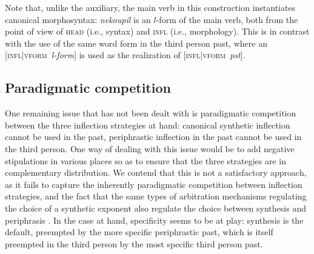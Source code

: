\documentclass[output=paper]{langsci/langscibook}
\begin{document}
Note that, unlike the auxiliary, the main verb in this construction instantiates canonical morphosyntax: \emph{nekoupil} is an $l$-form of the main verb, both from the point of view of \textsc{head} (i.e., syntax) and \textsc{infl} (i.e., morphology). This is in contrast with the use of the same word form in the third person past, where an [\textsc{infl|vform}~\textit{l-form}] is used as the realization of [\textsc{infl|vform}~\textit{pst}]. 

\subsection{Paradigmatic competition}

One remaining issue that has not been dealt with is paradigmatic competition between the three inflection strategies at hand: canonical synthetic inflection cannot be used in the past, periphrastic inflection in the past cannot be used in the third  person. One way of dealing with this issue would be to add negative stipulations in various places so as to ensure that the three strategies are in complementary distribution. We contend that this is not a satisfactory approach, as it fails to capture the inherently paradigmatic competition between inflection strategies, and the fact that the same types of arbitration mechanisms regulating the choice of a synthetic exponent also regulate the choice between synthesis and periphrasis \citep{Bonami14d}. In the case at hand, specificity seems to be at play: synthesis is the default, preempted by the more specific periphrastic past, which is itself preempted in the third person by the most specific third person past. 
\end{document}
